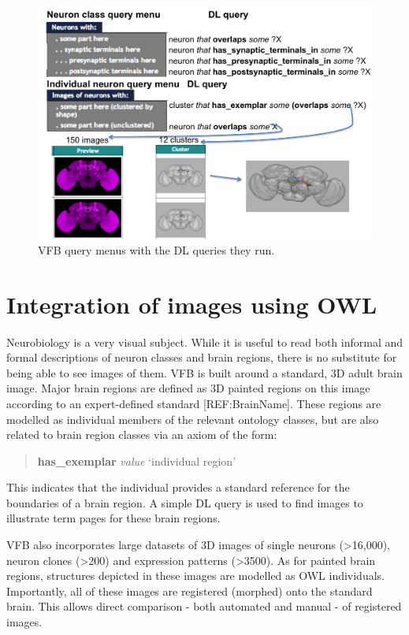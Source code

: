 \documentclass[runningheads,a4paper]{llncs}
\begin{document}
\begin{figure}
\centering
\includegraphics[width=120mm]{images/Query_menus_DL_images.png}
\caption{VFB query menus with the DL queries they run.}
\label{fig:Query_menus_DL_images}
\end{figure}

\section{Integration of images using OWL}

Neurobiology is a very visual subject.  While it is useful to read
both informal and formal descriptions of neuron classes and brain
regions, there is no substitute for being able to see images of them.
VFB is built around a standard, 3D adult brain image.  Major brain
regions are defined as 3D painted regions on this image according to
an expert-defined standard [REF:BrainName].  These regions are modelled as
individual members of the relevant ontology classes, but are also
related to brain region classes via an axiom of the form:

\begin{quote}
\textbf{has\_exemplar} \textit{value} `individual region'
\end{quote}

This indicates that the individual provides a standard reference for
the boundaries of a brain region.  A simple DL query is used to find
images to illustrate term pages for these brain regions.

VFB also incorporates large datasets of 3D images of single neurons
(\textgreater 16,000), neuron clones (\textgreater 200) and expression
patterns (\textgreater 3500). As for painted brain regions, structures
depicted in these images are modelled as OWL individuals.
Importantly, all of these images are registered (morphed) onto the
standard brain. This allows direct comparison - both automated and
manual  - of registered images.
\end{document}
